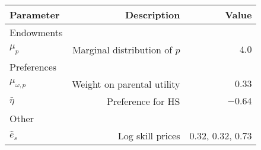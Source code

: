 \begin{tabular}{lrr}
\hline
Parameter & Description  & Value  \\
\hline
Endowments &   &   \\
$\mu_{p}$ & Marginal distribution of $p$  & $4.0$  \\
Preferences &   &   \\
$\mu_{\omega,p}$ & Weight on parental utility  & $0.33$  \\
$\bar{\eta}$ & Preference for HS  & $-0.64$  \\
Other &   &   \\
$\hat{e}_{s}$ & Log skill prices  & 0.32, 0.32, 0.73  \\
\hline
\end{tabular}%
